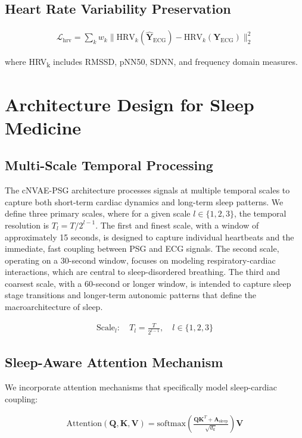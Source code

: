 \documentclass[11pt,en]{elegantpaper}
\begin{document}
\subsection{Heart Rate Variability Preservation}

\begin{align}
\mathcal{L}_{\text{hrv}} = \sum_{k} w_k \|\text{HRV}_k(\hat{\mathbf{Y}}_{\text{ECG}}) - \text{HRV}_k(\mathbf{Y}_{\text{ECG}})\|_2^2
\end{align}

where HRV\textsubscript{k} includes RMSSD, pNN50, SDNN, and frequency domain measures.

\section{Architecture Design for Sleep Medicine}

\subsection{Multi-Scale Temporal Processing}

The cNVAE-PSG architecture processes signals at multiple temporal scales to capture both short-term cardiac dynamics and long-term sleep patterns. We define three primary scales, where for a given scale $l \in \{1, 2, 3\}$, the temporal resolution is $T_l = T / 2^{l-1}$. The first and finest scale, with a window of approximately 15 seconds, is designed to capture individual heartbeats and the immediate, fast coupling between PSG and ECG signals. The second scale, operating on a 30-second window, focuses on modeling respiratory-cardiac interactions, which are central to sleep-disordered breathing. The third and coarsest scale, with a 60-second or longer window, is intended to capture sleep stage transitions and longer-term autonomic patterns that define the macroarchitecture of sleep.

\begin{align}
\text{Scale}_l: \quad T_l = \frac{T}{2^{l-1}}, \quad l \in \{1, 2, 3\}
\end{align}

\subsection{Sleep-Aware Attention Mechanism}

We incorporate attention mechanisms that specifically model sleep-cardiac coupling:

\begin{align}
\text{Attention}(\mathbf{Q}, \mathbf{K}, \mathbf{V}) = \text{softmax}\left(\frac{\mathbf{Q}\mathbf{K}^T + \mathbf{A}_{\text{sleep}}}{\sqrt{d_k}}\right)\mathbf{V}
\end{align}
\end{document}
